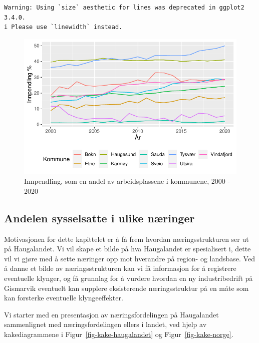 \documentclass[
]{article}
\begin{document}
\begin{verbatim}
Warning: Using `size` aesthetic for lines was deprecated in ggplot2 3.4.0.
i Please use `linewidth` instead.
\end{verbatim}

\begin{figure}[H]

{\centering \includegraphics{Masteroppgave_files/figure-pdf/fig-innpendling-1.pdf}

}

\caption{\label{fig-innpendling}Innpendling, som en andel av
arbeidsplassene i kommunene, 2000 - 2020}

\end{figure}

\hypertarget{andelen-sysselsatte-i-ulike-nuxe6ringer}{%
\subsection{Andelen sysselsatte i ulike
næringer}\label{andelen-sysselsatte-i-ulike-nuxe6ringer}}

Motivasjonen for dette kapittelet er å få frem hvordan næringsstrukturen
ser ut på Haugalandet. Vi vil skape et bilde på hva Haugalandet er
spesialisert i, dette vil vi gjøre med å sette næringer opp mot
hverandre på region- og landsbase. Ved å danne et bilde av
næringsstrukturen kan vi få informasjon for å registrere eventuelle
klynger, og få grunnlag for å vurdere hvordan en ny industribedrift på
Gismarvik eventuelt kan supplere eksisterende næringsstruktur på en måte
som kan forsterke eventuelle klyngeeffekter.

Vi starter med en presentasjon av næringsfordelingen på Haugalandet
sammenlignet med næringsfordelingen ellers i landet, ved hjelp av
kakediagrammene i Figur~\ref{fig-kake-haugalandet} og
Figur~\ref{fig-kake-norge}.
\end{document}
